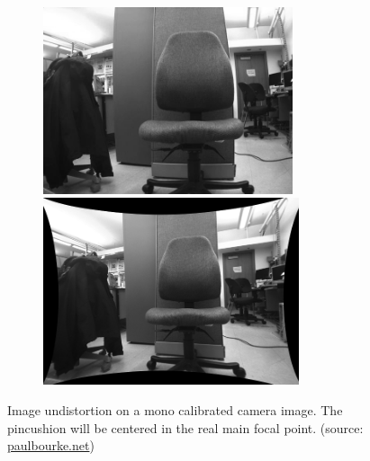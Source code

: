 \begin{figure}
\centering

\begin{subfigure} 
\centering   
\begin{minipage}[t]{0.49\textwidth}
\includegraphics[width=\linewidth, height=5.5cm]{pictures/mono-distorted}
\end{minipage}
\begin{minipage}[t]{0.49\textwidth}
\includegraphics[width=\linewidth, height=5.5cm]{pictures/mono-undistorted}
\end{minipage}
\end{subfigure}
\caption{Image undistortion on a mono calibrated camera image. The pincushion will be centered in the real main focal point.  (source: \href{http://paulbourke.net/stereographics/stereorender/}{paulbourke.net})}
\label{fig:mono_undistort}

\vspace*{0.4cm}


\end{figure}
